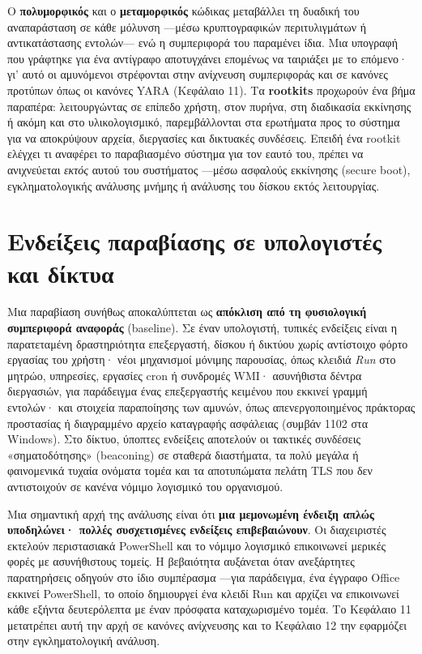 \documentclass[11pt,openany]{book}
\begin{document}
Ο \textbf{πολυμορφικός} και ο \textbf{μεταμορφικός} κώδικας μεταβάλλει τη δυαδική του αναπαράσταση σε κάθε μόλυνση —μέσω κρυπτογραφικών περιτυλιγμάτων ή αντικατάστασης εντολών— ενώ η συμπεριφορά του παραμένει ίδια. Μια υπογραφή που γράφτηκε για ένα αντίγραφο αποτυγχάνει επομένως να ταιριάξει με το επόμενο· γι' αυτό οι αμυνόμενοι στρέφονται στην ανίχνευση συμπεριφοράς και σε κανόνες προτύπων όπως οι κανόνες YARA (Κεφάλαιο 11). Τα \textbf{rootkits} προχωρούν ένα βήμα παραπέρα: λειτουργώντας σε επίπεδο χρήστη, στον πυρήνα, στη διαδικασία εκκίνησης ή ακόμη και στο υλικολογισμικό, παρεμβάλλονται στα ερωτήματα προς το σύστημα για να αποκρύψουν αρχεία, διεργασίες και δικτυακές συνδέσεις. Επειδή ένα rootkit ελέγχει τι αναφέρει το παραβιασμένο σύστημα για τον εαυτό του, πρέπει να ανιχνεύεται \emph{εκτός} αυτού του συστήματος —μέσω ασφαλούς εκκίνησης (secure boot), εγκληματολογικής ανάλυσης μνήμης ή ανάλυσης του δίσκου εκτός λειτουργίας.

\section{Ενδείξεις παραβίασης σε υπολογιστές και δίκτυα}\label{sec:4.3}
Μια παραβίαση συνήθως αποκαλύπτεται ως \textbf{απόκλιση από τη φυσιολογική συμπεριφορά αναφοράς} (baseline). Σε έναν υπολογιστή, τυπικές ενδείξεις είναι η παρατεταμένη δραστηριότητα επεξεργαστή, δίσκου ή δικτύου χωρίς αντίστοιχο φόρτο εργασίας του χρήστη· νέοι μηχανισμοί μόνιμης παρουσίας, όπως κλειδιά \emph{Run} στο μητρώο, υπηρεσίες, εργασίες cron ή συνδρομές WMI· ασυνήθιστα δέντρα διεργασιών, για παράδειγμα ένας επεξεργαστής κειμένου που εκκινεί γραμμή εντολών· και στοιχεία παραποίησης των αμυνών, όπως απενεργοποιημένος πράκτορας προστασίας ή διαγραμμένο αρχείο καταγραφής ασφάλειας (συμβάν 1102 στα Windows). Στο δίκτυο, ύποπτες ενδείξεις αποτελούν οι τακτικές συνδέσεις «σηματοδότησης» (beaconing) σε σταθερά διαστήματα, τα πολύ μεγάλα ή φαινομενικά τυχαία ονόματα τομέα και τα αποτυπώματα πελάτη TLS που δεν αντιστοιχούν σε κανένα νόμιμο λογισμικό του οργανισμού.

Μια σημαντική αρχή της ανάλυσης είναι ότι \textbf{μια μεμονωμένη ένδειξη απλώς υποδηλώνει· πολλές συσχετισμένες ενδείξεις επιβεβαιώνουν}. Οι διαχειριστές εκτελούν περιστασιακά PowerShell και το νόμιμο λογισμικό επικοινωνεί μερικές φορές με ασυνήθιστους τομείς. Η βεβαιότητα αυξάνεται όταν ανεξάρτητες παρατηρήσεις οδηγούν στο ίδιο συμπέρασμα —για παράδειγμα, ένα έγγραφο Office εκκινεί PowerShell, το οποίο δημιουργεί ένα κλειδί Run και αρχίζει να επικοινωνεί κάθε εξήντα δευτερόλεπτα με έναν πρόσφατα καταχωρισμένο τομέα. Το Κεφάλαιο 11 μετατρέπει αυτή την αρχή σε κανόνες ανίχνευσης και το Κεφάλαιο 12 την εφαρμόζει στην εγκληματολογική ανάλυση.
\end{document}
